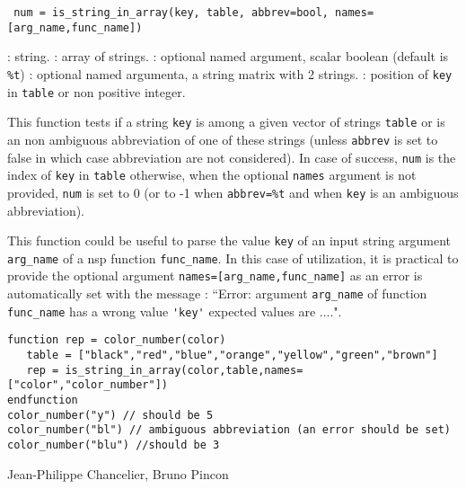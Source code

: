 
\begin{mandesc}
\end{mandesc}
\begin{calling_sequence}
\begin{verbatim}
 num = is_string_in_array(key, table, abbrev=bool, names=[arg_name,func_name])  
\end{verbatim}
\end{calling_sequence}
\begin{parameters}
  \begin{varlist}
    : string.
    : array of strings.
    : optional named argument, scalar boolean (default is \verb+%t+)
    : optional named argumenta, a string matrix with 2 strings.
    : position of \verb+key+ in \verb+table+ or non positive integer.
  \end{varlist}
\end{parameters}
\begin{mandescription}
  This function tests if a string \verb+key+ is among a given vector of strings \verb+table+
 or is an non ambiguous abbreviation of one of these strings (unless \verb+abbrev+ 
 is set to false in which case abbreviation are not considered). In case of success, 
 \verb+num+ is the index of \verb+key+ in  \verb+table+ otherwise, when the optional
 \verb+names+ argument is not provided, \verb+num+ is set to 0 
 (or to -1 when \verb+abbrev=%t+ and when \verb+key+ is an ambiguous abbreviation).
   
 
  This function could be useful to parse the value \verb+key+ of an input string argument 
 \verb+arg_name+ of a nsp function  \verb+func_name+. In this case of utilization, it is
 practical to provide the optional argument \verb+names=[arg_name,func_name]+ as an error 
 is automatically set with the message : ``Error:  argument \verb+arg_name+ of function  
\verb+func_name+  has a wrong value \verb+'key'+ expected values are ....".

\end{mandescription}
\begin{examples}
\begin{Verbatim}
function rep = color_number(color)
   table = ["black","red","blue","orange","yellow","green","brown"]
   rep = is_string_in_array(color,table,names=["color","color_number"])
endfunction
color_number("y") // should be 5
color_number("bl") // ambiguous abbreviation (an error should be set)
color_number("blu") //should be 3
\end{Verbatim}
\end{examples}

\begin{manseealso}
\end{manseealso}

\begin{authors}
  Jean-Philippe Chancelier, Bruno Pincon
\end{authors}


